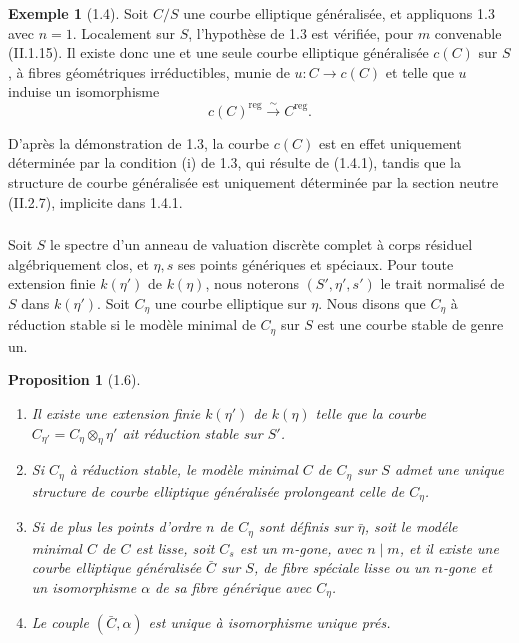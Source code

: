\documentclass[11pt,a4paper]{amsart}
\theoremstyle{plain}
\newtheorem{proposition}[theorem]{Proposition}
\theoremstyle{definition}
\newtheorem{example}[theorem]{Exemple}
\DeclareMathOperator{\reg}{reg}
\begin{document}
\begin{example}[1.4]
Soit $C/S$ une courbe elliptique g\'en\'eralis\'ee, et appliquons 1.3 avec $n=1$. Localement sur $S$, l'hypoth\`ese de 1.3 est v\'erifi\'ee, pour $m$ convenable (II.1.15). Il existe donc une et une seule courbe elliptique g\'en\'eralis\'ee $c(C)$ sur $S$, \`a fibres g\'eom\'etriques irr\'eductibles, munie de $u \colon C \to c(C)$ et telle que $u$ induise un isomorphisme
\begin{equation}\label{eq:1.4.1}
c(C)^{\reg} \xrightarrow{\sim} C^{\reg}.
\end{equation}

D'apr\`es la d\'emonstration de 1.3, la courbe $c(C)$ est en effet uniquement d\'etermin\'ee par la condition (i) de 1.3, qui r\'esulte de (1.4.1), tandis que la structure de courbe g\'en\'eralis\'ee est uniquement d\'etermin\'ee par la section neutre (II.2.7), implicite dans 1.4.1.
\end{example}

\subsubsection{}
Soit $S$ le spectre d'un anneau de valuation discr\`ete complet \`a corps r\'esiduel alg\'ebriquement clos, et $\eta, s$ ses points g\'en\'eriques et sp\'eciaux. Pour toute extension finie $k(\eta')$ de $k(\eta)$, nous noterons $(S', \eta', s')$ le trait normalis\'e de $S$ dans $k(\eta')$. Soit $C_{\eta}$ une courbe elliptique sur $\eta$. Nous disons que $C_{\eta}$ \`a r\'eduction stable si le mod\`ele minimal de $C_{\eta}$ sur $S$ est une courbe stable de genre un.

\begin{proposition}[1.6]
\begin{enumerate}[label=(\roman*)]
\item Il existe une extension finie $k(\eta')$ de $k(\eta)$ telle que la courbe $C_{\eta'} = C_{\eta} \otimes_{\eta} \eta'$ ait r\'eduction stable sur $S'$.
\item Si $C_{\eta}$ \`a r\'eduction stable, le mod\`ele minimal $C$ de $C_{\eta}$ sur $S$ admet une unique structure de courbe elliptique g\'en\'eralis\'ee prolongeant celle de $C_{\eta}$.
\item Si de plus les points d'ordre $n$ de $C_{\eta}$ sont d\'efinis sur $\bar{\eta}$, soit le mod\'ele minimal $C$ de $C$ est lisse, soit $C_s$ est un $m$-gone, avec $n \mid m$, et il existe une courbe elliptique g\'en\'eralis\'ee $\bar{C}$ sur $S$, de fibre sp\'eciale lisse ou un $n$-gone et un isomorphisme $\alpha$ de sa fibre g\'en\'erique avec $C_{\eta}$.
\item Le couple $(\bar{C}, \alpha)$ est unique \`a isomorphisme unique pr\'es.
\end{enumerate}
\end{proposition}
\end{document}
